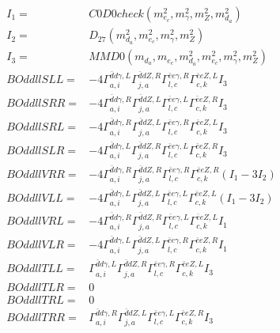 \documentclass[A4,landscape]{article}
\begin{document}
\begin{align} 
I_1 = & C0D0check(m^2_{e_{{c}}}, m^2_{\gamma}, m^2_{Z}, m^2_{d_{{a}}}) \\ 
I_2 = & D_{27}(m^2_{d_{{a}}}, m^2_{e_{{c}}}, m^2_{\gamma}, m^2_{Z}) \\ 
I_3 = & MMD0(m_{d_{{a}}}, m_{e_{{c}}}, m^2_{d_{{a}}}, m^2_{e_{{c}}}, m^2_{\gamma}, m^2_{Z}) \\ 
  BOddllSLL= & -4  \Gamma^{\bar{d}d \gamma ,L}_{a, i} \Gamma^{\bar{d}d Z ,R}_{j, a} \Gamma^{\bar{e}e \gamma ,R}_{l, c} \Gamma^{\bar{e}e Z ,L}_{c, k} I_3 \\ 
  BOddllSRR= & -4  \Gamma^{\bar{d}d \gamma ,R}_{a, i} \Gamma^{\bar{d}d Z ,L}_{j, a} \Gamma^{\bar{e}e \gamma ,L}_{l, c} \Gamma^{\bar{e}e Z ,R}_{c, k} I_3 \\ 
  BOddllSRL= & -4  \Gamma^{\bar{d}d \gamma ,R}_{a, i} \Gamma^{\bar{d}d Z ,L}_{j, a} \Gamma^{\bar{e}e \gamma ,R}_{l, c} \Gamma^{\bar{e}e Z ,L}_{c, k} I_3 \\ 
  BOddllSLR= & -4  \Gamma^{\bar{d}d \gamma ,L}_{a, i} \Gamma^{\bar{d}d Z ,R}_{j, a} \Gamma^{\bar{e}e \gamma ,L}_{l, c} \Gamma^{\bar{e}e Z ,R}_{c, k} I_3 \\ 
  BOddllVRR= & -4  \Gamma^{\bar{d}d \gamma ,R}_{a, i} \Gamma^{\bar{d}d Z ,R}_{j, a} \Gamma^{\bar{e}e \gamma ,R}_{l, c} \Gamma^{\bar{e}e Z ,R}_{c, k} (I_1 - 3 I_2) \\ 
  BOddllVLL= & -4  \Gamma^{\bar{d}d \gamma ,L}_{a, i} \Gamma^{\bar{d}d Z ,L}_{j, a} \Gamma^{\bar{e}e \gamma ,L}_{l, c} \Gamma^{\bar{e}e Z ,L}_{c, k} (I_1 - 3 I_2) \\ 
  BOddllVRL= & -4  \Gamma^{\bar{d}d \gamma ,R}_{a, i} \Gamma^{\bar{d}d Z ,R}_{j, a} \Gamma^{\bar{e}e \gamma ,L}_{l, c} \Gamma^{\bar{e}e Z ,L}_{c, k} I_1 \\ 
  BOddllVLR= & -4  \Gamma^{\bar{d}d \gamma ,L}_{a, i} \Gamma^{\bar{d}d Z ,L}_{j, a} \Gamma^{\bar{e}e \gamma ,R}_{l, c} \Gamma^{\bar{e}e Z ,R}_{c, k} I_1 \\ 
  BOddllTLL= &  \Gamma^{\bar{d}d \gamma ,L}_{a, i} \Gamma^{\bar{d}d Z ,R}_{j, a} \Gamma^{\bar{e}e \gamma ,R}_{l, c} \Gamma^{\bar{e}e Z ,L}_{c, k} I_3 \\ 
  BOddllTLR= & 0 \\ 
  BOddllTRL= & 0 \\ 
  BOddllTRR= &  \Gamma^{\bar{d}d \gamma ,R}_{a, i} \Gamma^{\bar{d}d Z ,L}_{j, a} \Gamma^{\bar{e}e \gamma ,L}_{l, c} \Gamma^{\bar{e}e Z ,R}_{c, k} I_3 \\ 
\end{align} 
\end{document}
